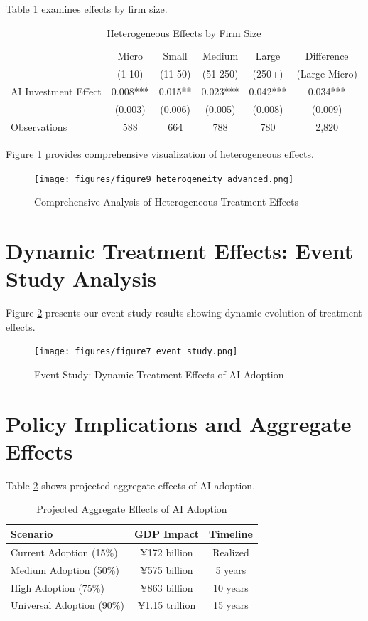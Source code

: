 \documentclass[12pt]{article}
\begin{document}
Table \ref{tab:size_heterogeneity} examines effects by firm size.

\begin{table}[H]
\centering
\caption{Heterogeneous Effects by Firm Size}
\label{tab:size_heterogeneity}
\begin{tabular}{lccccc}
\toprule
 & Micro & Small & Medium & Large & Difference \\
 & (1-10) & (11-50) & (51-250) & (250+) & (Large-Micro) \\
\midrule
AI Investment Effect & 0.008*** & 0.015** & 0.023*** & 0.042*** & 0.034*** \\
 & (0.003) & (0.006) & (0.005) & (0.008) & (0.009) \\
\midrule
Observations & 588 & 664 & 788 & 780 & 2,820 \\
\bottomrule
\end{tabular}
\end{table}

Figure \ref{fig:heterogeneity_advanced} provides comprehensive visualization of heterogeneous effects.

\begin{figure}[H]
\centering
\texttt{[image: figures/figure9\_heterogeneity\_advanced.png]}
\caption{Comprehensive Analysis of Heterogeneous Treatment Effects}
\label{fig:heterogeneity_advanced}
\end{figure}

\section{Dynamic Treatment Effects: Event Study Analysis}

Figure \ref{fig:event_study} presents our event study results showing dynamic evolution of treatment effects.

\begin{figure}[H]
\centering
\texttt{[image: figures/figure7\_event\_study.png]}
\caption{Event Study: Dynamic Treatment Effects of AI Adoption}
\label{fig:event_study}
\end{figure}

\section{Policy Implications and Aggregate Effects}

Table \ref{tab:aggregate} shows projected aggregate effects of AI adoption.

\begin{table}[H]
\centering
\caption{Projected Aggregate Effects of AI Adoption}
\label{tab:aggregate}
\begin{tabular}{lcc}
\toprule
Scenario & GDP Impact & Timeline \\
\midrule
Current Adoption (15\%) & ¥172 billion & Realized \\
Medium Adoption (50\%) & ¥575 billion & 5 years \\
High Adoption (75\%) & ¥863 billion & 10 years \\
Universal Adoption (90\%) & ¥1.15 trillion & 15 years \\
\bottomrule
\end{tabular}
\end{table}
\end{document}
